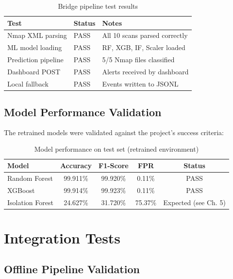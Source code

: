 \begin{table}[H]
\centering
\caption{Bridge pipeline test results}
\label{tab:unit_tests}
\begin{tabular}{lll}
\toprule
\textbf{Test} & \textbf{Status} & \textbf{Notes} \\
\midrule
Nmap XML parsing & PASS & All 10 scans parsed correctly \\
ML model loading & PASS & RF, XGB, IF, Scaler loaded \\
Prediction pipeline & PASS & 5/5 Nmap files classified \\
Dashboard POST & PASS & Alerts received by dashboard \\
Local fallback & PASS & Events written to JSONL \\
\bottomrule
\end{tabular}
\end{table}

\subsection{Model Performance Validation}

The retrained models were validated against the project's success criteria:

\begin{table}[H]
\centering
\caption{Model performance on test set (retrained environment)}
\label{tab:model_validation}
\begin{tabular}{lcccc}
\toprule
\textbf{Model} & \textbf{Accuracy} & \textbf{F1-Score} & \textbf{FPR} & \textbf{Status} \\
\midrule
Random Forest & 99.911\% & 99.920\% & 0.11\% & PASS \\
XGBoost & 99.914\% & 99.923\% & 0.11\% & PASS \\
Isolation Forest & 24.627\% & 31.720\% & 75.37\% & Expected (see Ch. 5) \\
\bottomrule
\end{tabular}
\end{table}

\section{Integration Tests}

\subsection{Offline Pipeline Validation}

